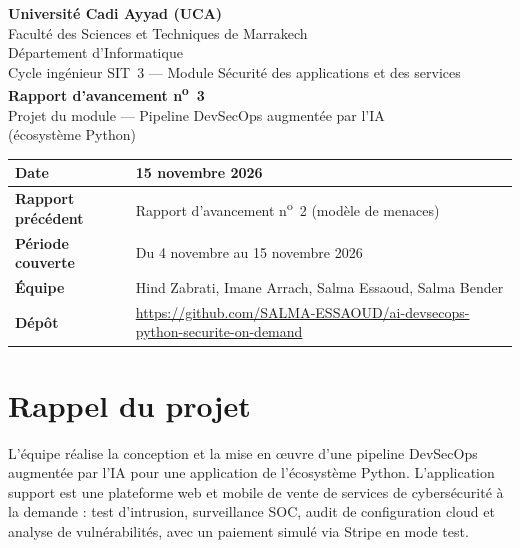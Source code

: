\documentclass[11pt,a4paper]{article}
\begin{document}
\thispagestyle{empty}

\begin{center}
  {\large \textbf{Université Cadi Ayyad (UCA)}}\\[0.2em]
  Faculté des Sciences et Techniques de Marrakech\\
  Département d'Informatique\\[0.5em]
  Cycle ingénieur SIT~3 --- Module \og Sécurité des applications et des services \fg{}\\[2em]

  {\LARGE \textbf{Rapport d'avancement n\textsuperscript{o}~3}}\\[0.6em]
  {\large Projet du module --- Pipeline DevSecOps augmentée par l'IA\\
  (écosystème Python)}\\[2em]

  \renewcommand{\arraystretch}{1.5}
  \begin{tabular}{|>{\bfseries}l|p{10cm}|}
    \hline
    Date & 15 novembre 2026 \\
    \hline
    Rapport précédent & Rapport d'avancement n\textsuperscript{o}~2 (modèle de menaces) \\
    \hline
    Période couverte & Du 4 novembre au 15 novembre 2026 \\
    \hline
    Équipe & Hind Zabrati, Imane Arrach, Salma Essaoud, Salma Bender \\
    \hline
    Dépôt & \url{https://github.com/SALMA-ESSAOUD/ai-devsecops-python-securite-on-demand} \\
    \hline
  \end{tabular}
\end{center}

\newpage
\tableofcontents
\newpage

\section{Rappel du projet}

\begin{infobox}
L'équipe réalise la conception et la mise en \oe{}uvre d'une pipeline DevSecOps augmentée par
l'IA pour une application de l'écosystème Python. L'application support est une plateforme web
et mobile de vente de services de cybersécurité à la demande : test d'intrusion, surveillance
SOC, audit de configuration cloud et analyse de vulnérabilités, avec un paiement simulé via
Stripe en mode test.
\end{infobox}
\end{document}
